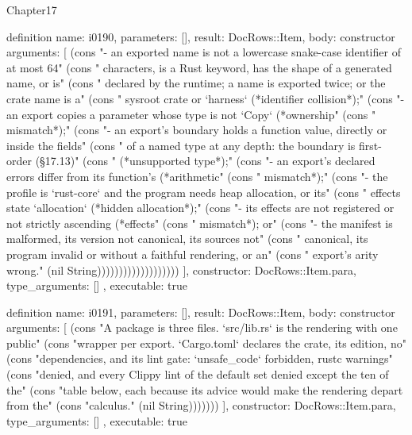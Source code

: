 \begin{lexlean}{Chapter17}
\begin{semanticmodule}
definition{
  name: i0190,
  parameters: [],
  result: DocRows::Item,
  body: constructor{
    arguments: [
      (cons "- an exported name is not a lowercase snake-case identifier of at most 64" (cons "  characters, is a Rust keyword, has the shape of a generated name, or is" (cons "  declared by the runtime; a name is exported twice; or the crate name is a" (cons "  sysroot crate or `harness` (*identifier collision*);" (cons "- an export copies a parameter whose type is not `Copy` (*ownership" (cons "  mismatch*);" (cons "- an export's boundary holds a function value, directly or inside the fields" (cons "  of a named type at any depth: the boundary is first-order (§17.13)" (cons "  (*unsupported type*);" (cons "- an export's declared errors differ from its function's (*arithmetic" (cons "  mismatch*);" (cons "- the profile is `rust-core` and the program needs heap allocation, or its" (cons "  effects state `allocation` (*hidden allocation*);" (cons "- its effects are not registered or not strictly ascending (*effects" (cons "  mismatch*); or" (cons "- the manifest is malformed, its version not canonical, its sources not" (cons "  canonical, its program invalid or without a faithful rendering, or an" (cons "  export's arity wrong." (nil String)))))))))))))))))))
    ],
    constructor: DocRows::Item.para,
    type_arguments: []
  },
  executable: true
}

definition{
  name: i0191,
  parameters: [],
  result: DocRows::Item,
  body: constructor{
    arguments: [
      (cons "A package is three files. `src/lib.rs` is the rendering with one public" (cons "wrapper per export. `Cargo.toml` declares the crate, its edition, no" (cons "dependencies, and its lint gate: `unsafe_code` forbidden, rustc warnings" (cons "denied, and every Clippy lint of the default set denied except the ten of the" (cons "table below, each because its advice would make the rendering depart from the" (cons "calculus." (nil String)))))))
    ],
    constructor: DocRows::Item.para,
    type_arguments: []
  },
  executable: true
}


\end{semanticmodule}
\end{lexlean}
